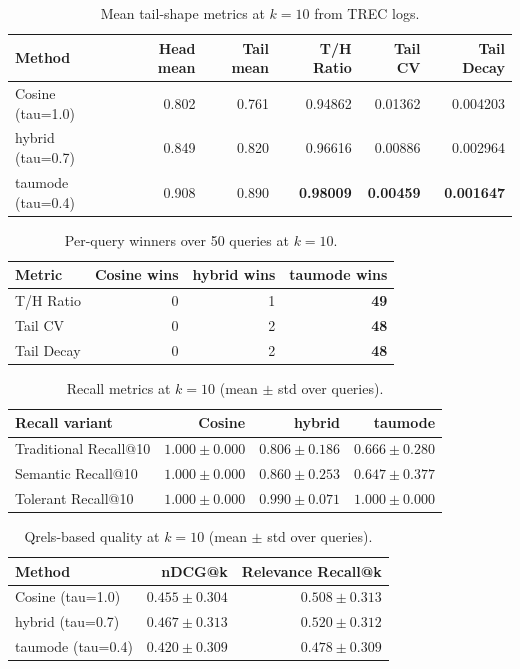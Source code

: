 \begin{table}[h]
\centering
\caption{Mean tail-shape metrics at $k=10$ from TREC logs.}
\begin{tabular}{lrrrrr}
\toprule
Method & Head mean & Tail mean & T/H Ratio & Tail CV & Tail Decay \\
\midrule
Cosine (tau=1.0) & 0.802 & 0.761 & 0.94862 & 0.01362 & 0.004203 \\
hybrid (tau=0.7) & 0.849 & 0.820 & 0.96616 & 0.00886 & 0.002964 \\
taumode (tau=0.4) & 0.908 & 0.890 & \textbf{0.98009} & \textbf{0.00459} & \textbf{0.001647} \\
\bottomrule
\end{tabular}
\end{table}

\begin{table}[h]
\centering
\caption{Per-query winners over 50 queries at $k=10$.}
\begin{tabular}{lrrr}
\toprule
Metric & Cosine wins & hybrid wins & taumode wins \\
\midrule
T/H Ratio & 0 & 1 & \textbf{49} \\
Tail CV & 0 & 2 & \textbf{48} \\
Tail Decay & 0 & 2 & \textbf{48} \\
\bottomrule
\end{tabular}
\end{table}

\begin{table}[h]
\centering
\caption{Recall metrics at $k=10$ (mean $\pm$ std over queries).}
\begin{tabular}{lrrr}
\toprule
Recall variant & Cosine & hybrid & taumode \\
\midrule
Traditional Recall@10 & $\mathbf{1.000\pm0.000}$ & $0.806\pm0.186$ & $0.666\pm0.280$ \\
Semantic Recall@10 & $\mathbf{1.000\pm0.000}$ & $0.860\pm0.253$ & $0.647\pm0.377$ \\
Tolerant Recall@10 & $\mathbf{1.000\pm0.000}$ & $0.990\pm0.071$ & $\mathbf{1.000\pm0.000}$ \\
\bottomrule
\end{tabular}
\end{table}

\begin{table}[h]
\centering
\caption{Qrels-based quality at $k=10$ (mean $\pm$ std over queries).}
\begin{tabular}{lrr}
\toprule
Method & nDCG@k & Relevance Recall@k \\
\midrule
Cosine (tau=1.0) & $0.455\pm0.304$ & $0.508\pm0.313$ \\
hybrid (tau=0.7) & $\mathbf{0.467\pm0.313}$ & $\mathbf{0.520\pm0.312}$ \\
taumode (tau=0.4) & $0.420\pm0.309$ & $0.478\pm0.309$ \\
\bottomrule
\end{tabular}
\end{table}

